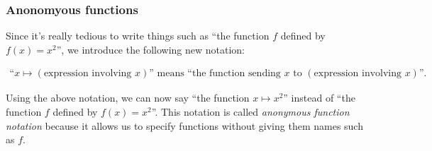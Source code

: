 \subsubsection*{Anonomyous functions}

Since it's really tedious to write things such as ``the function $f$ defined by $f(x) = x^2$'', we introduce the following new notation:

\begin{align*}
    \text{``}x \mapsto (\text{expression involving $x$}) \text{'' means ``the function sending $x$ to $(\text{expression involving $x$})$''}.
\end{align*}

Using the above notation, we can now say ``the function $x \mapsto x^2$'' instead of ``the function $f$ defined by $f(x) = x^2$''. This notation is called \textit{anonymous function notation} because it allows us to specify functions without giving them names such as $f$.

\begin{comment}
\subsection*{On ``$f$ is a function of $x$''}

In precalculus, you are likely to have heard or read statements such as ``let $f$ be a function of $x$''. This is a somewhat vague phrase. To understand what is meant by it, consider the following context. 

Suppose you are doing some calculations in which you have force $F$ ``as a function of position $x$'' and position $x$ ``as a function of time $t$''. (Don't worry if you don't know what ``force'' actually is). Formally, we have a function $F_x$ that maps position to force and a function $x_t$ that maps time to position. From these functions, we can obtain a function $F_t$ that maps time to force, defined by $F_t(t) := F_x(x_t(t))$, i.e. $F_t = F_x \circ x_t$.

Let's now consider the situation from a more general perspective. Every symbol $S$ that represents a physical quantity (such as $F$, $x$, $t$) is associated with a ``preferred symbol'' $T$. To say that $S$ has preferred symbol $T$ is to say that we prefer to think of the physical quantity represented by $S$ as depending on the physical quantity represented by $T$ rather than as depending on some other physical quantity. 

In the above example, the preferred symbol of $F$ would be $x$, since we started with the functions $F_x$ and $x_t$. $F$'s preferred symbol is \textit{not} $t$, because we did not start with the function $F_t$, and instead had to deduce it from $F_x$ and $x_t$.

[TO DO]
\end{comment}







